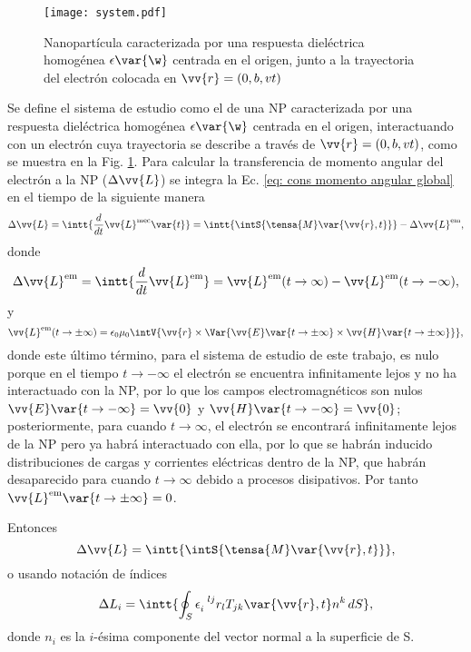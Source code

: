 \begin{figure}[h!]
\centering
\texttt{[image: system.pdf]}
\caption{\label{fig: system}Nanopartícula caracterizada por una respuesta dieléctrica homogénea $\epsilon\var{\w}$ centrada en el origen, junto a la trayectoria del electrón colocada en $\vv{r}=(0,b,vt)$}
\end{figure}

Se define el sistema de estudio como el de una NP caracterizada por una respuesta dieléctrica homogénea $\epsilon\var{\w}$ centrada en el origen, interactuando con un electrón cuya trayectoria se describe a través de $\vv{r}=(0,b,vt)$, como se muestra en la Fig. \ref{fig: system}. Para calcular la transferencia de momento angular del electrón a la NP ($\Delta \vv{L}$) se integra la Ec. \eqref{eq: cons momento angular global} en el tiempo de la siguiente manera
\begin{equation}
\Delta\vv{L} = \intt{\frac{d}{dt}\vv{L}^{\rm mec}\var{t}} = \intt{\intS{\tensa{M}\var{\vv{r},t}}} - \Delta\vv{L}^{\rm em},
\end{equation}
donde 
\begin{equation}
\Delta\vv{L}^{\rm em}=\intt{\frac{d}{dt}\vv{L}^{\rm em}} = \vv{L}^{\rm em}(t\to\infty)-\vv{L}^{\rm em}(t\to-\infty),
\end{equation}
y
\begin{equation}
\vv{L}^{\rm em}(t\to\pm\infty) = \epsilon_0 \mu_0  \intV{\vv{r}\times\Var{\vv{E}\var{t\to\pm\infty}\times\vv{H}\var{t\to\pm\infty}}},
\label{eq: Lem}
\end{equation}
donde este último término, para el sistema de estudio de este trabajo, es nulo porque en el tiempo $t\to -\infty$ el electrón se encuentra infinitamente lejos y no ha interactuado con la NP, por lo que los campos electromagnéticos son nulos \textemdash$\vv{E}\var{t\to-\infty}=\vv{0}$ y $\vv{H}\var{t\to-\infty}=\vv{0}$\textemdash; posteriormente, para cuando $t\to\infty$, el electrón se encontrará infinitamente lejos de la NP pero ya habrá interactuado con ella, por lo que se habrán inducido distribuciones de cargas y corrientes eléctricas dentro de la NP, que habrán desaparecido para cuando $t\to\infty$ debido a procesos disipativos. Por tanto $\vv{L}^{\rm em}\var{t\to\pm\infty}=0$.

Entonces
\begin{equation}
\Delta\vv{L} = \intt{\intS{\tensa{M}\var{\vv{r},t}}},
\end{equation}
o usando notación de índices
\begin{equation}
\Delta L_i =  \intt{\oint_S \epsilon_{i}^{\,\,\,\, lj} r_l T_{jk}\var{\vv{r},t} n^k\,dS},
\label{eq: angular momentum transfer index notation}
\end{equation}
donde $n_i$ es la $i$-ésima componente del vector normal a la superficie de S.

